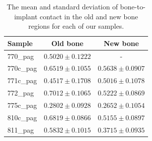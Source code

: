 \begin{table}
    \caption{The mean and standard deviation of bone-to-implant contact in the
    old and new bone regions for each of our samples.}
    \label{tab:bic}
    \centering
    \begin{tabular}{lcc}
        \toprule
        Sample & Old bone & New bone \\
        \midrule
        770\_pag & $0.5020 \pm 0.1222$ & - \\
        770c\_pag & $0.6519 \pm 0.1055$ & $0.5638 \pm 0.0907$ \\
        771c\_pag & $0.4517 \pm 0.1708$ & $0.5016 \pm 0.1078$ \\
        772\_pag & $0.7012 \pm 0.1065$ & $0.5222 \pm 0.0869$ \\
        775c\_pag & $0.2802 \pm 0.0928$ & $0.2652 \pm 0.1054$ \\
        810c\_pag & $0.6819 \pm 0.0866$ & $0.5155 \pm 0.0897$ \\
        811\_pag & $0.5832 \pm 0.1015$ & $0.3715 \pm 0.0935$ \\
        \bottomrule
    \end{tabular}
\end{table}

